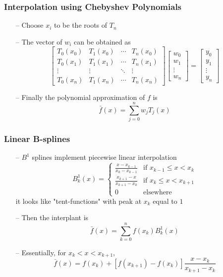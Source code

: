 \documentclass[aspectratio=169, 11pt]{beamer}
\begin{document}
\begin{frame}
\frametitle{Interpolation using Chebyshev Polynomials}
  \begin{itemize}
    \item[--] Choose $x_{i}$ to be the roots of $T_{n}$
    \bigskip
    \item[--] The vector of $w_{i}$ can be obtained as
    \[
      \left[\begin{array}{cccc}
      T_{0}\left(x_{0}\right) & T_{1}\left(x_{0}\right) & \cdots & T_{n}\left(x_{0}\right)\\
      T_{0}\left(x_{1}\right) & T_{1}\left(x_{1}\right) & \cdots & T_{n}\left(x_{1}\right)\\
      \vdots & \vdots & \ddots & \vdots\\
      T_{0}\left(x_{n}\right) & T_{1}\left(x_{n}\right) & \cdots & T_{n}\left(x_{n}\right)
      \end{array}\right]\left[\begin{array}{c}
      w_{0}\\
      w_{1}\\
      \vdots\\
      w_{n}
      \end{array}\right]=\left[\begin{array}{c}
      y_{0}\\
      y_{1}\\
      \vdots\\
      y_{n}
      \end{array}\right]
    \]
    \bigskip
    \item[--] Finally the polynomial approximation of $f$ is
    \[
      \bar{f}\left(x\right)=\sum_{j=0}^{n}w_{j}T_{j}\left(x\right)
    \]
  \end{itemize}
\end{frame}

\begin{frame}
\frametitle{Linear B-splines}
  \begin{itemize}
    \item[--] $B^{1}$ splines implement piecewise linear interpolation
    \[
      B_{k}^{1}\left(x\right)=\begin{cases}
      \frac{x-x_{k-1}}{x_{k}-x_{k-1}} & \text{if }x_{k-1}\leqslant x<x_{k}\\
      \frac{x_{k+1}-x}{x_{k+1}-x_{k}} & \text{if }x_{k}\leqslant x<x_{k+1}\\
      0 & \text{elsewhere}
      \end{cases}
    \]
    it looks like "tent-functions" with peak at $x_{k}$ equal to $1$
    \bigskip
    \item[--] Then the interplant is
    \[
      \bar{f}\left(x\right)=\sum_{k=0}^{n}f\left(x_{k}\right)B_{k}^{1}\left(x\right)
    \]
    \bigskip
    \item[--] Essentially, for $x_{k}<x<x_{k+1}$,
    \[
      \bar{f}\left(x\right)=f\left(x_{k}\right)+\left[f\left(x_{k+1}\right)-f\left(x_{k}\right)\right]\frac{x-x_{k}}{x_{k+1}-x_{k}}
    \]
  \end{itemize}
\end{frame}
\end{document}
